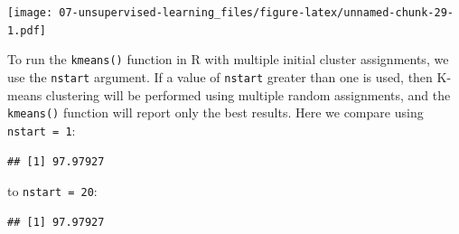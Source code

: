 \documentclass[openany]{book}
\newenvironment{Shaded}{\begin{snugshade}}{\end{snugshade}}
\newcommand{\DataTypeTok}[1]{\textcolor[rgb]{0.13,0.29,0.53}{#1}}
\newcommand{\DecValTok}[1]{\textcolor[rgb]{0.00,0.00,0.81}{#1}}
\newcommand{\KeywordTok}[1]{\textcolor[rgb]{0.13,0.29,0.53}{\textbf{#1}}}
\newcommand{\NormalTok}[1]{#1}
\newcommand{\OperatorTok}[1]{\textcolor[rgb]{0.81,0.36,0.00}{\textbf{#1}}}
\newcommand{\StringTok}[1]{\textcolor[rgb]{0.31,0.60,0.02}{#1}}
\begin{document}
\begin{Shaded}
\end{Shaded}

\texttt{[image: 07-unsupervised-learning\_files/figure-latex/unnamed-chunk-29-1.pdf]}

To run the \texttt{kmeans()} function in R with multiple initial cluster assignments,
we use the \texttt{nstart} argument. If a value of \texttt{nstart} greater than one
is used, then K-means clustering will be performed using multiple random
assignments, and the \texttt{kmeans()} function will
report only the best results. Here we compare using \texttt{nstart\ =\ 1}:

\begin{Shaded}
\end{Shaded}

\begin{verbatim}
## [1] 97.97927
\end{verbatim}

to \texttt{nstart\ =\ 20}:

\begin{Shaded}
\end{Shaded}

\begin{verbatim}
## [1] 97.97927
\end{verbatim}
\end{document}
